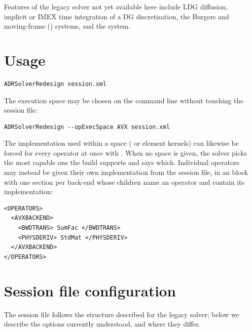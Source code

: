Features of the legacy solver not yet available here include LDG diffusion,
implicit or IMEX time integration of a DG discretisation, the Burgers and
moving-frame () systems, and the  system.

\section{Usage}
\begin{lstlisting}[style=BashInputStyle]
ADRSolverRedesign session.xml
\end{lstlisting}

The execution space may be chosen on the command line without touching the
session file:

\begin{lstlisting}[style=BashInputStyle]
ADRSolverRedesign --opExecSpace AVX session.xml
\end{lstlisting}

The implementation used within a space ( or 
element kernels) can likewise be forced for every operator at once with
. When no space is given, the solver picks the most capable one
the build supports and says which. Individual operators may instead be given
their own implementation from the session file, in an 
block with one section per back-end whose children name an operator and
contain its implementation:

\begin{lstlisting}[style=XmlStyle]
<OPERATORS>
  <AVXBACKEND>
    <BWDTRANS> SumFac </BWDTRANS>
    <PHYSDERIV> StdMat </PHYSDERIV>
  </AVXBACKEND>
</OPERATORS>
\end{lstlisting}

\section{Session file configuration}
\label{sec:sessionFileADRRedesign}
The session file follows the structure described for the legacy solver; below
we describe the options currently understood, and where they differ.


